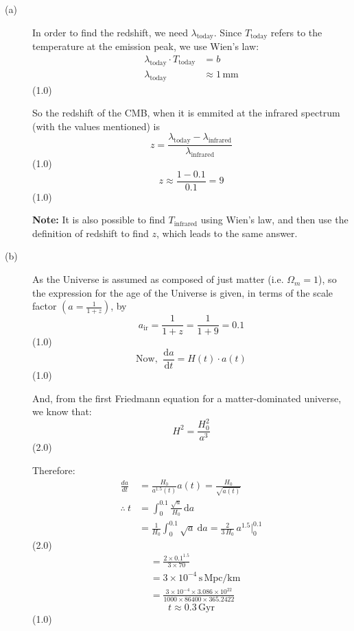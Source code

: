 \begin{description}
\item[(a)] In order to find the redshift, we need $\lambda_{\mathrm{today}}$.
  Since $T_{\mathrm{today}}$ refers to the temperature at the emission
  peak, we use Wien's law:
  \begin{align*}
  \lambda_{\mathrm{today}}\cdot T_{\mathrm{today}} &= b\\
  \lambda_{\mathrm{today}} &\approx 1\,\mathrm{mm}
  \end{align*}
  \hfill(1.0)

  So the redshift of the CMB, when it is emmited at the infrared spectrum
  (with the values mentioned) is
  \[ z = \frac{\lambda_{\mathrm{today}} - \lambda_{\mathrm{infrared}}}
              {\lambda_{\mathrm{infrared}}} \]
  \hfill(1.0)
  \[ z \approx \frac{1 - 0.1}{0.1} = 9 \]
  \hfill(1.0)

  \textbf{Note:} It is also possible to find $T_{\mathrm{infrared}}$ using
  Wien's law, and then use the definition of redshift to find $z$, which
  leads to the same answer.

\item[(b)] As the Universe is assumed as composed of just matter (i.e.
  $\Omega_m = 1$), so the expression for the age of the Universe is given,
  in terms of the scale factor $\left(a = \frac{1}{1+z}\right)$, by
  \[ a_{\mathrm{ir}} = \frac{1}{1+z} = \frac{1}{1+9} = 0.1 \]
  \hfill(1.0)
  \[ \text{Now, }\ \frac{\mathrm{d}a}{\mathrm{d}t} = H(t)\cdot a(t) \]
  \hfill(1.0)

  And, from the first Friedmann equation for a matter-dominated universe,
  we know that:
  \[ H^2 = \frac{H_0^2}{a^3} \]
  \hfill(2.0)

  Therefore:
  \begin{align*}
  \frac{da}{dt} &= \frac{H_0}{a^{1.5}(t)}a(t) = \frac{H_0}{\sqrt{a(t)}}\\
  \therefore\ t &= \int_0^{0.1}\frac{\sqrt{a}}{H_0}\,\mathrm{d}a\\
  &= \frac{1}{H_0}\int_0^{0.1}\sqrt{a}\ \mathrm{d}a
   = \frac{2}{3\,H_0}\,a^{1.5}\big|_0^{0.1}
  \end{align*}
  \hfill(2.0)
  \begin{align*}
  &= \frac{2\times 0.1^{1.5}}{3\times 70}\\
  &= 3\times 10^{-4}\,\mathrm{s\,Mpc/km}\\
  &= \frac{3\times 10^{-4}\times 3.086\times 10^{22}}
          {1000\times 86400\times 365.2422}
  \end{align*}
  \[ t \approx 0.3\,\mathrm{Gyr} \]
  \hfill(1.0)
\end{description}


